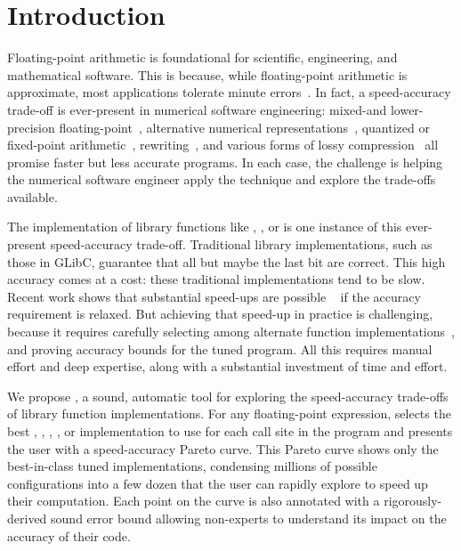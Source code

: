 \documentclass[paper.tex]{subfiles}
\begin{document}
\section{Introduction}
\label{sec:introduction}

Floating-point arithmetic is foundational for scientific, engineering,
  and mathematical software.
This is because, while floating-point arithmetic is approximate,
  most applications tolerate minute errors~\cite{cern}.
In fact, a speed-accuracy trade-off
  is ever-present in numerical software engineering:
  mixed-and lower-precision floating-point~\cite{fptuner,precimonious,salsa,hifptuner},
  alternative numerical representations~\cite{bfloat16,posit,block-numbers},
  quantized or fixed-point arithmetic~\cite{fixed},
  rewriting~\cite{pherbie},
  and various forms of lossy compression~\cite{fpcompression1,fpcompression2}
  all promise faster but less accurate programs.
In each case,
  the challenge is helping the numerical software engineer
  apply the technique
  and explore the trade-offs available.

The implementation of library functions like , , or 
  is one instance of this ever-present speed-accuracy trade-off.
Traditional library implementations, such as those in GLibC,
  guarantee that all but maybe the last bit are correct.
This high accuracy comes at a cost:
  these traditional implementations tend to be slow.
Recent work shows that substantial speed-ups are possible%
  ~\cite{cern,metalibm,daisy-libm,vanover}
  if the accuracy requirement is relaxed.
But achieving that speed-up in practice is challenging,
  because it requires carefully selecting
  among alternate function implementations~\cite{intel,cern,amd,openlibm},
  and proving accuracy bounds for the tuned program.
All this requires manual effort and deep expertise,
  along with a substantial investment of time and effort.

We propose \name, a sound, automatic tool
  for exploring the speed-accuracy trade-offs of library function implementations.
For any floating-point expression,
  \name selects the best , , , , or 
  implementation to use for each call site in the program
  and presents the user with a speed-accuracy Pareto curve.
This Pareto curve
  shows only the best-in-class tuned implementations,
  condensing millions of possible configurations
  into a few dozen that the user can rapidly explore
  to speed up their computation.
Each point on the curve is also annotated
  with a rigorously-derived sound error bound
  allowing non-experts to understand
  its impact on the accuracy of their code.
\end{document}
